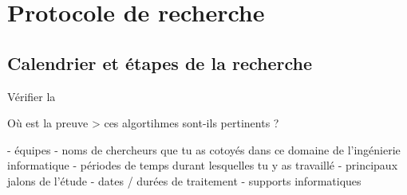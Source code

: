 \chapter{Protocole de recherche}

\section{Calendrier et étapes de la recherche}


    


    




Vérifier la 

Où est la preuve > ces algortihmes sont-ils pertinents ?


- équipes 
- noms de chercheurs que tu as cotoyés dans ce domaine de l'ingénierie informatique 
- périodes de temps durant lesquelles tu y as travaillé 
- principaux jalons de l'étude 
- dates / durées de  traitement
- supports informatiques 